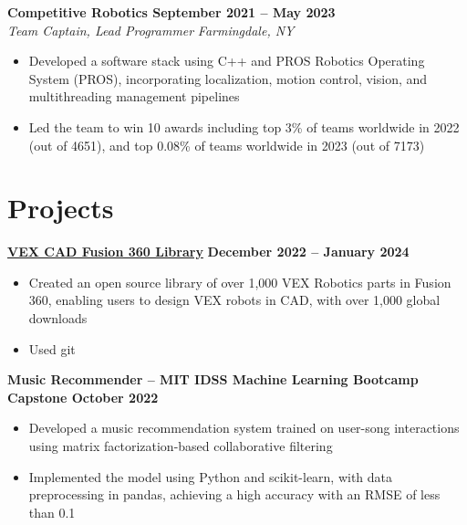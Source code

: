 \documentclass[11pt]{article}       %
\begin{document}
\textbf{Competitive Robotics \hfill September 2021 -- May 2023} \\
\emph{Team Captain, Lead Programmer} \hfill \emph{Farmingdale, NY}
\vspace{-8pt}
\begin{itemize}
  \item Developed a software stack using C++ and PROS Robotics Operating System (PROS), incorporating localization, motion control, vision, and multithreading management pipelines
  \item Led the team to win 10 awards including top 3\% of teams worldwide in 2022 (out of 4651), and top 0.08\% of teams worldwide in 2023 (out of 7173)
\end{itemize}



\vspace{-18.5pt}


\section*{Projects}

\textbf{\href{https://github.com/vindou/VEX-CAD-Fusion-360-Library}{VEX CAD Fusion 360 Library}} \hfill \textbf{December 2022 -- January 2024}
\vspace{-8pt}
\begin{itemize}
  \item Created an open source library of over 1,000 VEX Robotics parts in Fusion 360, enabling users to design VEX robots in CAD, with over 1,000 global downloads
  \item Used git 
\end{itemize}

\textbf{Music Recommender -- MIT IDSS Machine Learning Bootcamp Capstone \hfill October 2022}
\vspace{-8pt}
\begin{itemize}
  \item Developed a music recommendation system trained on user-song interactions using matrix factorization-based collaborative filtering 
  \item Implemented the model using Python and scikit-learn, with data preprocessing in pandas, achieving a high accuracy with an RMSE of less than 0.1
\end{itemize}
\end{document}
